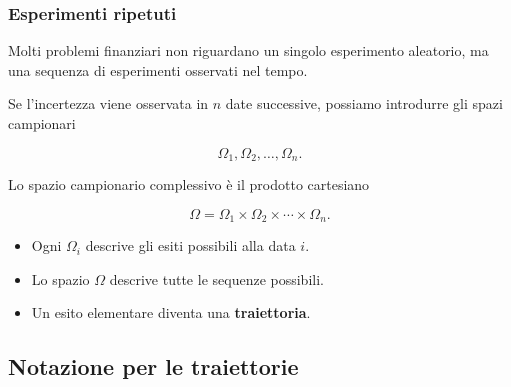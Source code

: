 \documentclass[handout]{beamer}%
\newenvironment{stepitemize}{\begin{itemize}[<+->]}{\end{itemize} }
\providecommand{\1}{\mathbf{1}}
\providecommand{\QTR}[2]{\csname #1\endcsname{#2}}
\begin{document}
\begin{frame}%
%

\frametitle{Esperimenti ripetuti}%


Molti problemi finanziari non riguardano un singolo esperimento aleatorio, ma
una sequenza di esperimenti osservati nel tempo.

\medskip

Se l'incertezza viene osservata in $n$ date successive, possiamo introdurre
gli spazi campionari%

\[
\Omega_{1},\Omega_{2},\ldots,\Omega_{n}.
\]


\medskip

Lo spazio campionario complessivo \`{e} il prodotto cartesiano%

\[
\Omega=\Omega_{1}\times\Omega_{2}\times\cdots\times\Omega_{n}.
\]


\medskip

\begin{stepitemize}
\item Ogni $\Omega_{i}$ descrive gli esiti possibili alla data $i$.

\item Lo spazio $\Omega$ descrive tutte le sequenze possibili.

\item Un esito elementare diventa una \textbf{traiettoria}.
\end{stepitemize}%

\transboxout
\end{frame}%




\subsection{Notazione per le traiettorie}%
\end{document}
